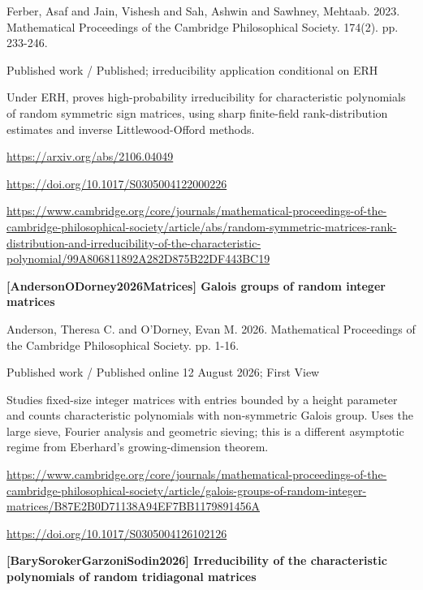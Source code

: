 \documentclass[11pt,a4paper,oneside,openany]{book}
\begin{document}
\color{black} Ferber, Asaf and Jain, Vishesh and Sah, Ashwin and Sawhney, Mehtaab. 2023. Mathematical Proceedings of the Cambridge Philosophical Society. 174(2). pp. 233-246.\par
{\small\sffamily\color{atlasgold}Published work / Published; irreducibility application conditional on ERH}\par
\color{black} Under ERH, proves high-probability irreducibility for characteristic polynomials of random symmetric sign matrices, using sharp finite-field rank-distribution estimates and inverse Littlewood-Offord methods.\par
{\footnotesize\url{https://arxiv.org/abs/2106.04049}}\par
{\footnotesize\url{https://doi.org/10.1017/S0305004122000226}}\par
{\footnotesize\url{https://www.cambridge.org/core/journals/mathematical-proceedings-of-the-cambridge-philosophical-society/article/abs/random-symmetric-matrices-rank-distribution-and-irreducibility-of-the-characteristic-polynomial/99A806811892A282D875B22DF443BC19}}\par
\vspace{9pt}
\hypertarget{ref:AndersonODorney2026Matrices}{}
{\sffamily\bfseries\color{atlasgreen}[AndersonODorney2026Matrices] Galois groups of random integer matrices}\par
\color{black} Anderson, Theresa C. and O'Dorney, Evan M. 2026. Mathematical Proceedings of the Cambridge Philosophical Society. pp. 1-16.\par
{\small\sffamily\color{atlasgold}Published work / Published online 12 August 2026; First View}\par
\color{black} Studies fixed-size integer matrices with entries bounded by a height parameter and counts characteristic polynomials with non-symmetric Galois group. Uses the large sieve, Fourier analysis and geometric sieving; this is a different asymptotic regime from Eberhard's growing-dimension theorem.\par
{\footnotesize\url{https://www.cambridge.org/core/journals/mathematical-proceedings-of-the-cambridge-philosophical-society/article/galois-groups-of-random-integer-matrices/B87E2B0D71138A94EF7BB1179891456A}}\par
{\footnotesize\url{https://doi.org/10.1017/S0305004126102126}}\par
\vspace{9pt}
\hypertarget{ref:BarySorokerGarzoniSodin2026}{}
{\sffamily\bfseries\color{atlasgreen}[BarySorokerGarzoniSodin2026] Irreducibility of the characteristic polynomials of random tridiagonal matrices}\par
\end{document}
